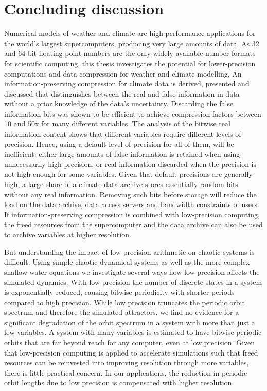 \chapter{Concluding discussion}
\label{chap:conclusions}

Numerical models of weather and climate are high-performance applications for the world's largest supercomputers, producing very large amounts of data. 
As 32 and 64-bit floating-point numbers are the only widely available number formats for scientific computing, this thesis investigates the potential
for lower-precision computations and data compression for weather and climate modelling. An information-preserving compression for climate data
is derived, presented and discussed that distinguishes between the real and false information in data without a prior knowledge of the data's uncertainty.
Discarding the false information bits was shown to be efficient to achieve compression factors between 10 and 50x for many different variables. 
The analysis of the bitwise real information content shows that different variables require different levels of precision.
Hence, using a default level of precision for all of them, will be inefficient: either large amounts of false information is retained when using unnecessarily
high precision, or real information discarded when the precision is not high enough for some variables. Given that default precisions are generally high,
a large share of a climate data archive stores essentially random bits without any real information. Removing such bits before storage will reduce
the load on the data archive, data access servers and bandwidth constraints of users. If information-preserving compression is combined
with low-precision computing, the freed resources from the supercomputer and the data archive can also be used to archive variables at
higher resolution.

But understanding the impact of low-precision arithmetic on chaotic systems is difficult. Using simple chaotic dynamical systems as well as the more
complex shallow water equations we investigate several ways how low precision affects the simulated dynamics. With low precision the number of
discrete states in a system is exponentially reduced, causing bitwise periodicity with shorter periods compared to high precision. While low precision
truncates the periodic orbit spectrum and therefore the simulated attractors, we find no evidence for a significant degradation of the orbit spectrum in
a system with more than just a few variables. A system with many variables is estimated to have bitwise periodic orbits that are far beyond reach for
any computer, even at low precision. Given that low-precision computing is applied to accelerate simulations such that freed resources can be
reinvested into improving resolution through more variables, there is little practical concern. In our applications, the reduction in periodic orbit lengths
due to low precision is compensated with higher resolution. 

